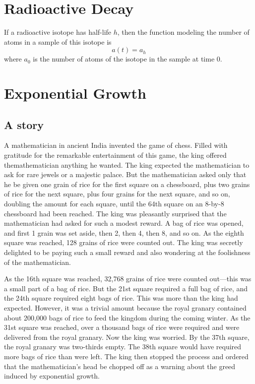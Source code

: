 \section{Radioactive Decay}
If a radioactive isotope has half-life \(h\), then the function modeling the number of atoms in a sample of this isotope is
\[ a(t) = a_{h}\]
where \(a_{0}\) is the number of atoms of the isotope in the sample at time \(0\).

\section{Exponential Growth}
\subsection{A story}
A mathematician in ancient India invented the game of chess. Filled with gratitude for the remarkable entertainment of this game, the king offered themathematician anything he wanted. The king expected the mathematician to ask for rare jewels or a majestic palace. But the mathematician asked only that he be given one grain of rice for the first square on a chessboard, plus two grains of rice for the next square, plus four grains for the next square, and so on, doubling the amount for each square, until the 64th square on an 8-by-8 chessboard had been reached. The king was pleasantly surprised that the mathematician had asked for such a modest reward. A bag of rice was opened, and first 1 grain was set aside, then 2, then 4, then 8, and so on. As the eighth square was reached, 128 grains of rice were counted out. The king was secretly delighted to be paying such a small reward and also wondering at the foolishness of the mathematician.

As the 16th square was reached, 32,768 grains of rice were counted out—this was a small part of a bag of rice. But the 21st square required a full bag of rice, and the 24th square required eight bags of rice. This was more than the king had expected. However, it was a trivial amount because the royal granary contained about 200,000 bags of rice to feed the kingdom during the coming winter. As the 31st square was reached, over a thousand bags of rice were required and were delivered from the royal granary. Now the king was worried. By the 37th square, the royal granary was two-thirds empty. The 38th square would have required more bags of rice than were left. The king then stopped the process and ordered that the mathematician's head be chopped off as a warning about the greed induced by exponential growth.

